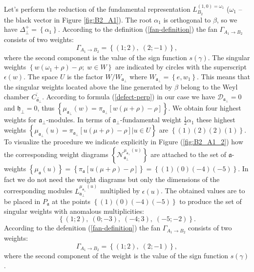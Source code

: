 \documentclass[12pt]{iopart}
\theoremstyle{definition}
\newcommand{\af}{\mathfrak{a}}
\newcommand{\afb}{\mathfrak{a}_{\bot}}
\newcommand{\hf}{\mathfrak{h}}
\begin{document}
Let's perform the reduction of the fundamental representation $L^{(1,0)=\omega_1}_{B_2}$
($\omega_1$ -- the black vector in Figure \ref{fig:B2_A1}). The root $\alpha_1$ is orthogonal to $\beta$,
so we have $\Delta_{\perp}^+ = \left\{ \alpha_1 \right\}$.
According to the definition (\ref{fan-definition})
the fan $\Gamma_{A_1\to B_2}$ consists of two weights:
\begin{equation*}
  \label{eq:22}
  \Gamma_{A_1\to B_2}=\left\{ (1;2),\; (2;-1) \right\},
\end{equation*}
where the second component is the value of the sign function $s(\gamma)$.
The singular weights  $\left\{ w (\omega_1 +\rho)-\rho ;\;w \in W\right\}$
are indicated by circles with the superscript $\epsilon\left( w \right)$.
The space $U$ is the factor $W/W_{\afb}$ where $W_{\afb}=\left\{e,w_1\right\}$.
This means that the singular weights located above the line generated by $\beta$
belong to the Weyl chamber $\overline{C_{\widetilde{\af_{\perp }}}}$.
According to formula (\ref{defect-perp}) in our case we have $\mathcal{D}_{\af_{\perp }}=0$ and
$\hf_{\perp }=0$, thus $\left\{ \mu _{\af_{\perp }}\left( w\right)
=\pi _{\af_{\perp }}\left[ w(\mu +\rho)-\rho \right]\right\}$.
We obtain four highest weights for $\af_{\perp }$-modules. In terms of
$\af_{\perp }$-fundamental weight $\frac{1}{2} \alpha_1$ these highest weights
$\left\{ \mu _{\af_{\perp }}\left( u\right)
=\pi _{\af_{\perp }}\left[ u(\mu +\rho)-\rho \right]| u \in U \right\}$
 are
$\left\{ \left( 1\right) \left( 2\right) \left( 2\right) \left( 1\right) \right\}$. To
visualize the procedure we indicate explicitly in Figure (\ref{fig:B2_A1_2}) how the
corresponding weight diagrams
$\left\{ \mathcal{N}_{\af_{\perp }}^{\mu _{\af_{\perp }}\left( u\right) }\right\} $
are attached to the set of $\af$-weights
$\left\{ \mu _{\af}\left( u\right)\right\} =\left\{\pi _{\af}\left[ u(\mu +\rho )-\rho \right]\right\}
=\left\{ \left( 1\right) \left( 0\right) \left( -4\right) \left( -5\right) \right\}$.
In fact we do not need the
weight diagrams but only the dimensions of the corresponding modules
$L_{\af_{\perp }}^{\mu_{\af_{\perp }}\left( u\right) }$ multiplied by
$\epsilon \left( u\right) $. The obtained values are to be placed in $P_{\af}$ at the points
$\left\{ \left( 1\right) \left( 0\right) \left( -4\right) \left( -5\right) \right\}$ to
produce the set of singular weights with anomalous multiplicities:
\begin{equation}
  \label{eq:25}
  \left\{(1;2),\; (0;-3),\; (-4;3),\; (-5;-2)\right\}.
\end{equation}
According to the defenition (\ref{fan-definition})
the fan $\Gamma_{A_1\to B_2}$ consists of two weights:
\begin{equation*}
  \label{eq:22}
  \Gamma_{A_1\to B_2}=\left\{ (1;2),\; (2;-1) \right\},
\end{equation*}
where the second component of the weight is the value of the sign function $s(\gamma)$.
\end{document}
